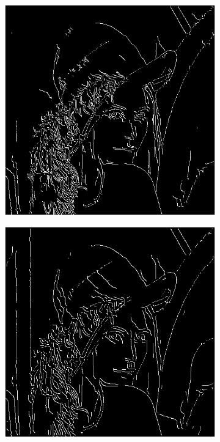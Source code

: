 \documentclass[a4paper]{article}
\begin{document}
\begin{figure}[h]

\begin{subfigure}{0.33\textwidth}
\includegraphics[width=\textwidth]{img/sigma1/lenahys0.png}
\end{subfigure}
\begin{subfigure}{0.33\textwidth}
\includegraphics[width=\textwidth]{img/sigma2/lenahys0.png}

\end{subfigure}
\end{figure}
\end{document}
